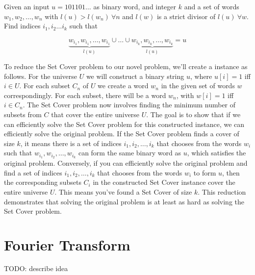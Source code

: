 Given an input $u = 101101\dots$ as binary word, and integer $k$ and a set of words $w_1, w_2, \dots, w_n$ with $l(u) > l(w_n) ~\forall n$ and $l(w)$ is a strict divisor of $l(u) ~ \forall w$. Find indices $i_1, i_2 \dots i_k$ such that

\[
\underbrace{w_{i_1}, w_{i_1}, \dots, w_{i_1}}_{l(u)} \cup \dots \cup \underbrace{w_{i_k}, w_{i_k}, \dots, w_{i_k}}_{l(u)} = u
\]

To reduce the Set Cover problem to our novel problem, we'll create a instance as follows. For the universe $U$ we will construct a binary string $u$, where $u[i] = 1$ iff $i \in U$. For each subset $C_n$ of $U$ we create a word $w_n$ in the given set of words $w$ correspondingly. For each subset, there will be a word $w_n$, with $w[i] = 1$ iff $i \in C_n$. The Set Cover problem now involves finding the minimum number of subsets from $C$ that cover the entire universe $U$. The goal is to show that if we can efficiently solve the Set Cover problem for this constructed instance, we can efficiently solve the original problem. If the Set Cover problem finds a cover of size $k$, it means there is a set of indices $i_1, i_2, \dots, i_k$ that chooses from the words $w_i$ such that $w_{i_1}, w_{i_2}, \dots, w_{i_k}$ can form the same binary word as $u$, which satisfies the original problem. Conversely, if you can efficiently solve the original problem and find a set of indices $i_1, i_2, \dots, i_k$ that chooses from the words $w_i$ to form $u$, then the corresponding subsets $C_i$ in the constructed Set Cover instance cover the entire universe $U$. This means you've found a Set Cover of size $k$. This reduction demonstrates that solving the original problem is at least as hard as solving the Set Cover problem.

\section{Fourier Transform}
TODO: describe idea



